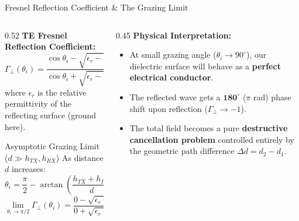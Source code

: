 \documentclass[aspectratio=169, 10pt]{beamer}
\begin{document}
\begin{frame}{Fresnel Reflection Coefficient \& The Grazing Limit}
    \begin{columns}[T]
        \begin{column}{0.52\textwidth}
            \textbf{TE Fresnel Reflection Coefficient:}
            \begin{equation}
                \Gamma_\perp(\theta_i) = \frac{\cos\theta_i - \sqrt{\epsilon_r - \sin^2\theta_i}}{\cos\theta_i + \sqrt{\epsilon_r - \sin^2\theta_i}}
            \end{equation}
            where $\epsilon_r$ is the relative permittivity of the reflecting surface (ground here).

            \vspace{0.2cm}
            \begin{alertblock}{Asymptotic Grazing Limit ($d \gg h_{TX}, h_{RX}$)}
                As distance $d$ increases:
                \begin{equation}
                    \theta_i = \frac{\pi}{2} - \arctan\left(\frac{h_{TX} + h_{RX}}{d}\right) \to \frac{\pi}{2}
                \end{equation}
                \begin{equation}
                    \lim_{\theta_i \to \pi/2} \Gamma_\perp(\theta_i) = \frac{0 - \sqrt{\epsilon_r - 1}}{0 + \sqrt{\epsilon_r - 1}} = \mathbf{-1}
                \end{equation}
            \end{alertblock}
        \end{column}
        
        \begin{column}{0.45\textwidth}
            \textbf{Physical Interpretation:}
            \begin{itemize}
                \item At small grazing angle ($\theta_i \to 90^\circ$), our dielectric surface will behave as a \textbf{perfect electrical conductor}.
                \item The reflected wave gets a $\mathbf{180^\circ}$ ($\pi$ rad) phase shift upon reflection ($\Gamma_\perp \to -1$).
                \item The total field becomes a pure \textbf{destructive cancellation problem} controlled entirely by the geometric path difference $\Delta d = d_2 - d_1$.
            \end{itemize}
        \end{column}
    \end{columns}
\end{frame}
\end{document}
